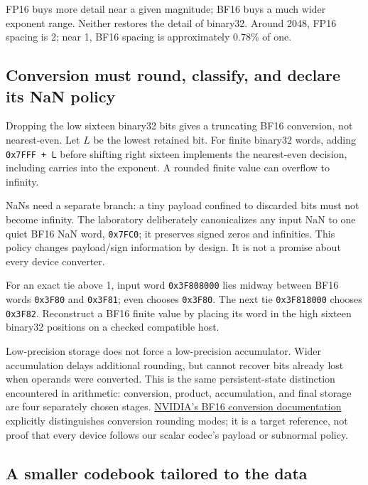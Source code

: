 FP16 buys more detail near a given magnitude; BF16 buys a much wider exponent range. Neither restores the detail of binary32. Around 2048, FP16 spacing is 2; near 1, BF16 spacing is approximately 0.78\% of one.

\subsection{Conversion must round, classify, and declare its NaN policy}\label{01-foundations-i-ch001-conversion-must-round-classify-and-declare-its-nan-policy}

Dropping the low sixteen binary32 bits gives a truncating BF16 conversion, not nearest-even. Let \(L\) be the lowest retained bit. For finite binary32 words, adding \texttt{0x7FFF\ +\ L} before shifting right sixteen implements the nearest-even decision, including carries into the exponent. A rounded finite value can overflow to infinity.

NaNs need a separate branch: a tiny payload confined to discarded bits must not become infinity. The laboratory deliberately canonicalizes any input NaN to one quiet BF16 NaN word, \texttt{0x7FC0}; it preserves signed zeros and infinities. This policy changes payload/sign information by design. It is not a promise about every device converter.

For an exact tie above 1, input word \texttt{0x3F808000} lies midway between BF16 words \texttt{0x3F80} and \texttt{0x3F81}; even chooses \texttt{0x3F80}. The next tie \texttt{0x3F818000} chooses \texttt{0x3F82}. Reconstruct a BF16 finite value by placing its word in the high sixteen binary32 positions on a checked compatible host.

Low-precision storage does not force a low-precision accumulator. Wider accumulation delays additional rounding, but cannot recover bits already lost when operands were converted. This is the same persistent-state distinction encountered in arithmetic: conversion, product, accumulation, and final storage are four separately chosen stages. \href{https://docs.nvidia.com/cuda/cuda-math-api/cuda_math_api/group__CUDA__MATH____BFLOAT16__MISC.html}{NVIDIA's BF16 conversion documentation} explicitly distinguishes conversion rounding modes; it is a target reference, not proof that every device follows our scalar codec's payload or subnormal policy.

\subsection{A smaller codebook tailored to the data}\label{01-foundations-i-ch001-a-smaller-codebook-tailored-to-the-data}

